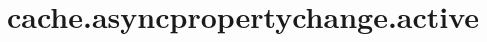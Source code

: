 \section{cache.asyncpropertychange.active}
\label{configuration:CacheAsyncpropertychangeActive}
\TODO
